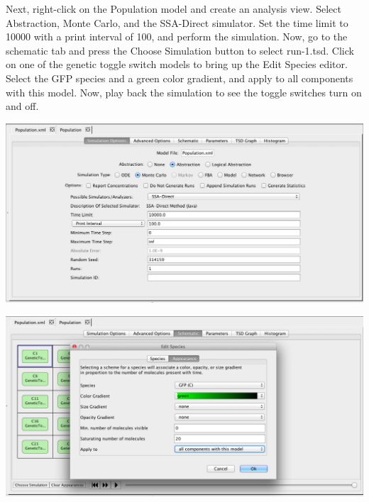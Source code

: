 \documentclass[titlepage,11pt]{article}
\begin{document}
Next, right-click on the Population model and create an analysis view.  Select Abstraction, Monte Carlo, and the SSA-Direct simulator.  Set the time limit to 10000 with a print interval of 100, and perform the simulation.  Now, go to the schematic tab and press the Choose Simulation button to select run-1.tsd.  Click on one of the genetic toggle switch models to bring up the Edit Species editor.  Select the GFP species and a green color gradient, and apply to all components with this model.  Now, play back the simulation to see the toggle switches turn on and off.

\begin{center}
\includegraphics[width=160mm]{screenshots/gridSimGT}
\end{center}


\begin{center}
\includegraphics[width=160mm]{screenshots/compAppearancesGT}
\end{center}
\end{document}
